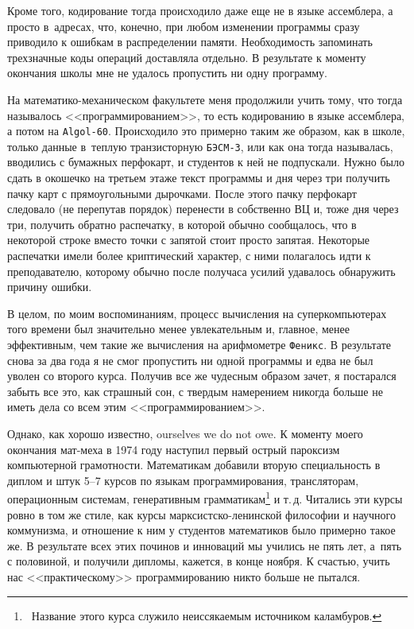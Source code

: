 \documentclass[intlimits,twoside,a4paper,11pt]{article}
\begin{document}
	Кроме того, кодирование тогда происходило даже еще не в языке ассемблера, 
	а просто в~адресах, что, конечно, при любом изменении программы сразу приводило 
	к ошибкам в распределении памяти. Необходимость запоминать трехзначные коды
	операций доставляла отдельно.  В результате к моменту окончания школы мне 
	не удалось пропустить ни одну программу.
	
	На математико-механическом факультете меня продолжили учить тому, что тогда называлось <<программированием>>, 
	то есть кодированию в языке ассемблера, а потом на {\tt Algol-60}. Происходило это примерно 
	таким же образом, как в школе, только данные в~теплую транзисторную {\tt БЭСМ-3}, или 
	как она тогда называлась, вводились с бумажных перфокарт, и студентов к ней не 
	подпускали. Нужно было сдать в окошечко на третьем этаже текст программы и дня
	через три получить пачку карт с прямоугольными дырочками. После этого пачку перфокарт следовало
	(не перепутав порядок) перенести в собственно ВЦ и, тоже дня через три, получить 
	обратно распечатку, в которой обычно сообщалось, что в некоторой строке вместо точки
	с запятой стоит просто запятая. Некоторые распечатки имели более криптический
	характер, с ними полагалось идти к преподавателю, которому обычно после получаса
	усилий удавалось обнаружить причину ошибки.
	
	В целом, по моим воспоминаниям, процесс вычисления на суперкомпьютерах того 
	времени был значительно менее увлекательным и, главное, менее эффективным, 
	чем такие же вычисления на арифмометре {\tt Феникс}. В результате снова за два года я не смог
	пропустить ни одной программы и едва не был уволен со второго курса. Получив все 
	же чудесным образом зачет, я постарался забыть все это, как страшный сон, с твердым
	намерением никогда больше не иметь дела со всем этим <<программированием>>.
	
	Однако, как хорошо известно, ourselves we do not owe. К моменту моего окончания 
	мат-меха в 1974 году наступил первый острый пароксизм 
	компьютерной
	грамотности. Математикам добавили вторую специальность в диплом и штук 
	5--7 курсов по языкам программирования, трансляторам, операционным системам,
	генеративным грамматикам\footnote{~Название этого курса
		служило неиссякаемым источником каламбуров.} и т.\,д. 
	Читались эти курсы ровно в том же стиле, как курсы марксистско-ленинской философии
	и научного коммунизма, и отношение к ним у студентов математиков было примерно 
	такое же. В результате всех этих починов и инноваций мы учились не пять лет, 
	а~пять с половиной, и получили дипломы, кажется, в конце ноября. К счастью, учить нас 
	<<практическому>> программированию никто больше не пытался.
	
\end{document}
